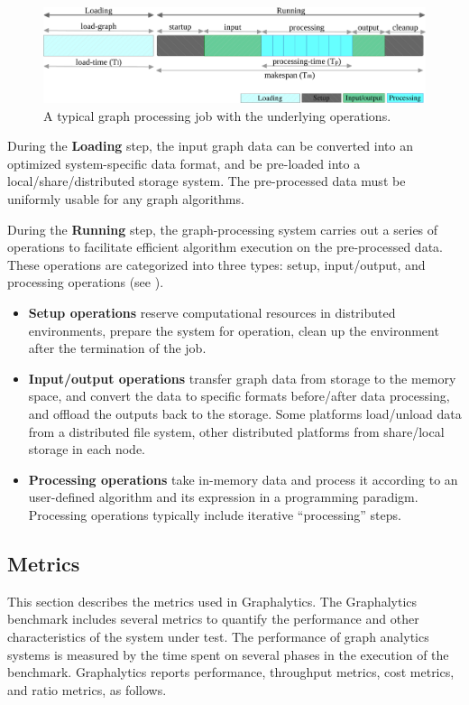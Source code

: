 \begin{figure}[h]
	\centering
	\includegraphics[width=0.9\linewidth]{figures/benchmark-job.pdf}
	\caption{A typical graph processing job with the underlying operations.}
	\label{fig:job}
\end{figure}


During the \textbf{Loading} step, the input graph data can be converted into an optimized system-specific data format, and be pre-loaded into a local/share/distributed storage system. The pre-processed data must be uniformly usable for any graph algorithms.

During the \textbf{Running} step, the graph-processing system carries out a series of operations to facilitate efficient algorithm execution on the pre-processed data. These operations are categorized into three types: setup, input/output, and processing operations (see ).
\begin{itemize}
    \item \textbf{Setup operations} reserve computational resources in distributed environments, prepare the system for operation, clean up the environment after the termination of the job.
    \item \textbf{Input/output operations} transfer graph data from storage to the memory space, and convert the data to specific formats before/after data processing, and offload the outputs back to the storage. Some platforms load/unload data from a distributed file system, other distributed platforms from share/local storage in each node. 
    \item \textbf{Processing operations} take in-memory data and process it according to an user-defined algorithm and its expression in a programming paradigm. Processing operations typically include iterative ``processing'' steps.
\end{itemize}








\subsection{Metrics} 
\label{sec:def:metrics}
This section describes the metrics used in Graphalytics. The Graphalytics benchmark includes several metrics to quantify the performance and other characteristics of the system under test. The performance of graph analytics systems is measured by the time spent on several phases in the execution of the benchmark. Graphalytics reports performance, throughput metrics, cost metrics, and ratio metrics, as follows.



